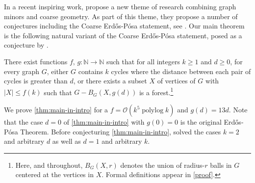 \documentclass{patmorin}
\newcommand{\pat}[1]{\textcolor{Blue}{[Pat: #1]}}
\DeclareMathOperator{\polylog}{polylog}
\newcommand{\Oh}{\mathcal{O}}
\begin{document}
In a recent inspiring work, \citet{GP23} propose a new theme of research combining graph minors and coarse geometry. 
As part of this theme, they propose a number of conjectures including the Coarse Erdős-Pósa statement, see \cite[Conjecture 9.7]{GP23}. Our main theorem is the following natural variant of the Coarse Erdős-Pósa statement, posed as a conjecture by \citet{ahn.gollin:coarse}.
\begin{thm}\label{thm:main-in-intro}
  There exist functions $f,\, g:\mathbb{N}\to\mathbb{N}$ such that for all integers $k\ge 1$ and $d\ge 0$, for every graph $G$,  either $G$ contains $k$ cycles where the distance between each pair of cycles is greater than $d$, or  there exists a subset $X$ of vertices of $G$ with $|X|\leq f(k)$ such that  $G-B_G(X,g(d))$ is a forest.\footnote{Here, and throughout, $B_G(X,r)$ denotes the union of radius-$r$ balls in $G$ centered at the vertices in $X$.  Formal definitions appear in \cref{proof}.}
\end{thm}
We prove \cref{thm:main-in-intro} for a $f=\Oh(k^5\polylog k)$ and $g(d)=13d$. 
Note that the case $d=0$ of \cref{thm:main-in-intro} with $g(0)=0$ is the original Erd\H{o}s-Pósa Theorem. 
Before conjecturing \cref{thm:main-in-intro}, \citet{ahn.gollin:coarse} solved the cases $k=2$ and arbitrary $d$ as well as $d=1$ and arbitrary $k$.  




\end{document}
